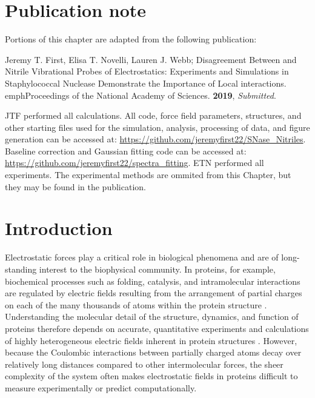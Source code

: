 \section{Publication note} \label{snase-pub-note}

Portions of this chapter are adapted from the following publication:

\noindent Jeremy T. First, Elisa T. Novelli, Lauren J. Webb; Disagreement Between \pKa{} and Nitrile Vibrational Probes of Electrostatics: Experiments and Simulations in Staphylococcal Nuclease Demonstrate the Importance of Local interactions. emph{Proceedings of the National Academy of Sciences}. \textbf{2019}, \emph{Submitted}. 

JTF performed all calculations.
All code, force field parameters, structures, and other starting files used for the simulation, analysis, processing of data, and figure generation can be accessed at:
\url{https://github.com/jeremyfirst22/SNase_Nitriles}. 
Baseline correction and Gaussian fitting code can be accessed at: 
\url{https://github.com/jeremyfirst22/spectra_fitting}. 
ETN performed all experiments. The experimental methods are ommited from this Chapter, but they may be found in the publication.

\section{Introduction} \label{snase-intro}

Electrostatic forces play a critical role in biological phenomena and are of long-standing interest to the biophysical community. 
In proteins, for example, biochemical processes such as folding, catalysis, and intramolecular interactions are regulated by electric fields resulting from the arrangement of partial charges on each of the many thousands of atoms within the protein structure \cite{Honig1995}. 
Understanding the molecular detail of the structure, dynamics, and function of proteins therefore depends on accurate, quantitative experiments and calculations of highly heterogeneous electric fields inherent in protein structures \cite{Warshel1978}. 
However, because the Coulombic interactions between partially charged atoms decay over relatively long distances compared to other intermolecular forces, the sheer complexity of the system often makes electrostatic fields in proteins difficult to measure experimentally or predict computationally.

